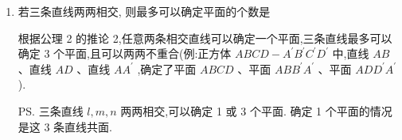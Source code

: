 \begin{enumerate}
\begin{jieda}
        \ps 过一条直线和这条直线外不共线的三点,由于平面 ${PQR}$ 必然存在,因此最少可以确定 1 个平面,可以确定 1 或 3 或 4 个平面. 确定 1 个平面的情况是直线 $l$ 恰好在平面 ${PQR}$ 上且不过 $P,Q,R$ 任意一点. 确定 3 个平面的情况如: 正方体 ${ABCD} - {A}^{\prime }{B}^{\prime }{C}^{\prime }{D}^{\prime }$ 中, ${A}^{\prime }{B}^{\prime }$ 与 $A,B,C$ 三点.
    \end{jieda}
    \item 若三条直线两两相交, 则最多可以确定平面的个数是 
    \begin{jieda}
        根据公理 2 的推论 2,任意两条相交直线可以确定一个平面,三条直线最多可以确定 3 个平面,且可以两两不重合(例:正方体 ${ABCD} - {A}^{\prime }{B}^{\prime }{C}^{\prime }{D}^{\prime }$ 中,直线 ${AB}$ 、直线 ${AD}$ 、直线 $A{A}^{\prime }$ ,确定了平面 ${ABCD}$ 、平面 ${AB}{B}^{\prime }{A}^{\prime }$ 、平面 ${AD}{D}^{\prime }{A}^{\prime }$ ). 
        
        \ps 三条直线 $l,m,n$ 两两相交,可以确定 1 或 3 个平面. 确定 1 个平面的情况是这 3 条直线共面.
    \end{jieda}
    

\end{enumerate}
